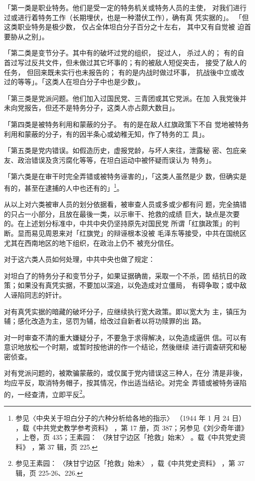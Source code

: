 「第一类是职业特务。他们是受一定的特务机关或特务人员的主使， 对我们进行
过或进行着特务工作（长期埋伏，也是一种潜伏工作），确有真 凭实据的」。
「但这类职业特务是极少数， 仅占全体坦白分子百分之十左右， 其中又有自觉被
迫首要胁从之别」。

「第二类是变节分子。其中有的破坏过党的组织， 捉过人， 杀过人的； 有的自
首过写过反共文件，但未做过其它坏事的；有的被敌人短促突击， 接受了敌人的
任务， 但回来既未实行也未报告的； 有的是内战时做过坏事， 抗战後中立或改
过的等等」。「这类人在坦白分子中也是少数」。

「第三类是党派问题。他们加入过国民党、三青团或其它党派。在加
入我党後并未向党报告，但还不是特务分子，这类人亦占颇大数目」。

「第四类是被特务利用和蒙蔽的分子。
有的是在敌人红旗政策下不自
觉地被特务利用和蒙蔽的分子，有的因半条心或幼稚无知，作了特务的工
具」。

「第五类是党内错误。如假造历史，虚报党龄，与坏人来往，泄露秘
密、包庇亲友、政治错误及贪污腐化等等，在坦白运动中被怀疑而误认为
特务」。

「第六类是在审干时完全弄错或被特务诬害的」，「这类人虽然是少
数，但确实是有的，甚至在逮捕的人中也还有的」\footnote{参见〈中央关于坦白分子的六种分析给各地的指示〉
（1944 年 1 月 24 日）
，载《中共党史教学参考资料》
，第 17
册，页 387；另参见《刘少奇年谱》
，上卷，页 435；王素园：
〈陕甘宁边区「抢救」始末〉
。载《中共党史资料》
，第 37
辑，页 225.}。

从以上对六类被审人员的划分依据看，被审查人员或多或少都有问
题，完全搞错的只占一小部分，且放在最後一类，以示审干、抢救的成绩
巨大，缺点是次要的。在上述划分标准中，中共中央仍坚持原先对国民党
所谓「红旗政策」的判断。显而易见周恩来对「红旗党」的辩诬根本没被
毛泽东等接受，中共在国统区尤其在西南地区的地下组织，在政治上仍不
被充分信任。

对于这六类人员如何处理，中共中央也做了规定：

对坦白了的特务分子和变节分子，如果证据确凿，采取一个不杀，团
结抗日的政策；如果没有真凭实据，不要加以深追，以免造成对立僵局，
有碍争取；或中敌人诬陷同志的奸计。

对有真凭实据的暗藏的破坏分子，应继续执行宽大政策。即以宽大为
主，镇压为辅；感化改造为主，惩罚为辅，给改过自新者以将功赎罪的出
路。

对一时审查不清的重大嫌疑分子，不要急于求得解决，以免造成逼供
信。可以有意识地放松一个时期，或暂时按他讲的作一个结论，然後继续
进行调查研究和秘密侦查。

对有党派问题的，被欺骗蒙蔽的，或仅属于党内错误这三种人，在分
清是非後，均应平反，取消特务帽子，按其情况，作出适当结论。对完全
弄错或被特务诬陷的，一经查清，立即平反\footnote{参见王素园：
〈陕甘宁边区「抢救」始未〉
，载《中共党史资料》
，第 37 辑，页 225-26、226.}。

